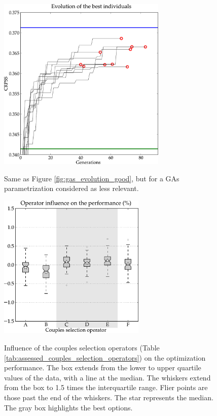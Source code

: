 \documentclass{ametsoc}
\begin{document}
\begin{figure}[t]
	\begin{center}
		\noindent\includegraphics[width=19pc,angle=0]{figures/gas_evolution_bad.pdf}\\
	\end{center}
	\caption{Same as Figure \ref{fig:gas_evolution_good}, but for a GAs parametrization considered as less relevant.}
	\label{fig:gas_evolution_bad}
\end{figure}

\begin{figure}[t]
	\begin{center}
		\noindent\includegraphics[width=7cm,angle=0]{figures/operator_selectcoupl_score.pdf}\\
	\end{center}
	\caption{Influence of the couples selection operators (Table \ref{tab:assessed_couples_selection_operators}) on the optimization performance. The box extends from the lower to upper quartile values of the data, with a line at the median. The whiskers extend from the box to 1.5 times the interquartile range. Flier points are those past the end of the whiskers. The star represents the median. The gray box highlights the best options.}
	\label{fig:operator_selectcoupl_score}
\end{figure}
\end{document}
